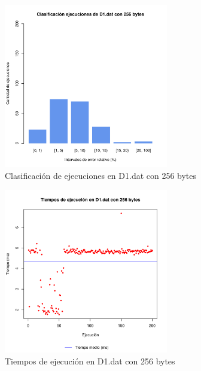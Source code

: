 \begin{figure}[h!]
    \centering
        \includegraphics[width=0.64\textwidth]{../figs/D1/plot_count_256.pdf}
        \caption{Clasificación de ejecuciones en D1.dat con 256 bytes}
    \label{figura:D1_count_256}
\end{figure}

\begin{figure}[h!]
    \centering
        \includegraphics[width=0.64\textwidth]{../figs/D1/plot_time_256.pdf}
        \caption{Tiempos de ejecución en D1.dat con 256 bytes}
    \label{figura:D1_time_256}
\end{figure}

\clearpage
